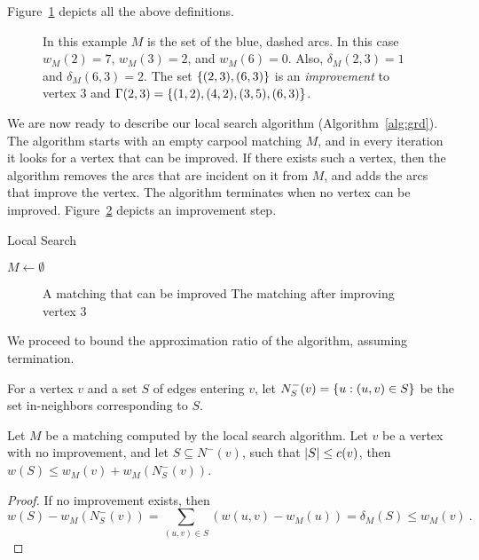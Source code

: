 Figure~\ref{fig:defs} depicts all the above definitions.

\begin{figure}
\centering

\caption{In this example $M$ is the set of the blue, dashed arcs.
In this case $w_M(2) = 7$, $w_M(3) = 2$, and $w_M(6) = 0$.  Also,
$\delta_M(2, 3) = 1$ and $\delta_M(6, 3) = 2$.  The set $\left\{ (2,3),
(6,3) \right\}$ is an \emph{improvement} to vertex 3 and $\Gamma(2,3)
= \left\{ (1,2),(4,2),(3,5),(6,3) \right\}$.}
\label{fig:defs}
\end{figure}

We are now ready to describe our local search algorithm
(Algorithm~\ref{alg:grd}).  The algorithm starts with an empty
carpool matching $M$, and in every iteration it looks for a vertex
that can be improved.  If there exists such a vertex, then the
algorithm removes the arcs that are incident on it from $M$, and adds
the arcs that improve the vertex.  The algorithm terminates when no
vertex can be improved.  Figure~\ref{fig:improvement} depicts an
improvement step.

\begin{algorithm}
\caption{Local Search}
\label{alg:ls}
$M \gets \emptyset$ \\
\end{algorithm}

\begin{figure}
\centering

\caption[]{
\label{fig:improvement}
A matching that can be improved
The matching after improving vertex 3
}
\end{figure}

We proceed to bound the approximation ratio of the algorithm, assuming
termination.

For a vertex $v$ and a set $S$ of edges entering $v$, let $N^-_S(v)
= \left\{ u : (u,v) \in S \right\}$ be the set in-neighbors corresponding to $S$.

\begin{lemma}
\label{lm:no improve}
Let $M$ be a matching computed by the local search algorithm.  Let $v$
be a vertex with no improvement, and let $S \subseteq N^-(v)$, such
that $\left| S \right| \leq c(v)$, then $w(S) \leq w_M(v) + w_M(N^-_S(v))$.
\end{lemma}
\begin{proof}
If no improvement exists, then
\[
w(S) - w_M(N^-_S(v))
=    \sum_{(u,v) \in S} (w(u,v) - w_M(u))
=    \delta_M(S) 
\leq w_M(v)
~.
\]
\end{proof}

